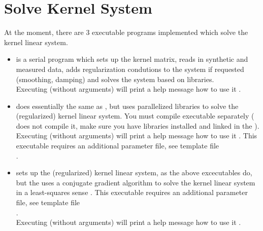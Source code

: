 \section{Solve Kernel System} \label{basic_steps,sec:solve_kernel_system}
%
At the moment, there are 3 executable programs implemented which solve the kernel linear system.
\begin{itemize}
\item
{} is a serial program which sets up the kernel matrix, 
reads in synthetic and measured data, adds regularization condutions to the system if 
requested (smoothing, damping) and solves the system based on  libraries.\\
Executing  (without arguments) will print a help message how to use it 
.
\item 
{} does essentially the same as , but uses
parallelized  libraries to solve the (regularized) kernel linear system. You
must compile executable  separately ( does not
compile it, make sure you have  libraries installed and linked in the 
).
Executing  (without arguments) will print a help message how to use it 
.
This executable requires an additional parameter file, see template file\\
.
\item 
{} sets up the (regularized) kernel linear system, as the above
excecutables do, but the uses a conjugate gradient algorithm to solve the kernel linear system
in a least-squares sense .
This executable requires an additional parameter file, see template file\\
.\\
Executing  (without arguments) will print a help message how to use it 
.
\end{itemize}

